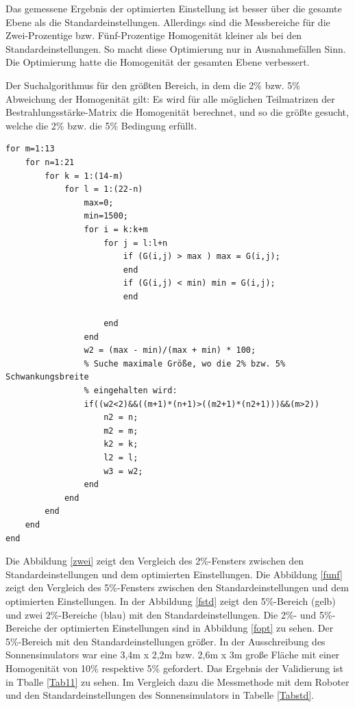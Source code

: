 \documentclass[a4paper,bibtotoc,oneside]{scrbook}
\begin{document}
Das gemessene Ergebnis der optimierten Einstellung ist besser über die gesamte Ebene als die Standardeinstellungen.
Allerdings sind die Messbereiche für die Zwei-Prozentige bzw. Fünf-Prozentige Homogenität kleiner als bei den Standardeinstellungen. So macht diese Optimierung nur in Ausnahmefällen Sinn. Die Optimierung hatte die Homogenität der gesamten Ebene verbessert.

Der Suchalgorithmus für den größten Bereich, in dem die 2\% bzw. 5\% Abweichung der Homogenität gilt: Es wird für alle möglichen Teilmatrizen der Bestrahlungsstärke-Matrix die Homogenität berechnet, und so die größte gesucht, welche die 2\% bzw. die 5\% Bedingung erfüllt.
\begin{verbatim}
for m=1:13
    for n=1:21
        for k = 1:(14-m)
            for l = 1:(22-n)
                max=0;
                min=1500;
                for i = k:k+m
                    for j = l:l+n
                        if (G(i,j) > max ) max = G(i,j);
                        end
                        if (G(i,j) < min) min = G(i,j);
                        end
                        
                    end
                end
                w2 = (max - min)/(max + min) * 100;
                % Suche maximale Größe, wo die 2% bzw. 5% Schwankungsbreite
                % eingehalten wird:
                if((w2<2)&&((m+1)*(n+1)>((m2+1)*(n2+1)))&&(m>2))
                    n2 = n;
                    m2 = m;
                    k2 = k;
                    l2 = l;
                    w3 = w2;
                end
            end
        end
    end
end
\end{verbatim}

Die Abbildung \ref{zwei} zeigt den Vergleich des 2\%-Fensters zwischen den Standardeinstellungen und dem optimierten Einstellungen.
Die Abbildung \ref{funf} zeigt den Vergleich des 5\%-Fensters zwischen den Standardeinstellungen und dem optimierten Einstellungen.
In der Abbildung \ref{fstd} zeigt den 5\%-Bereich (gelb) und zwei 2\%-Bereiche (blau) mit den Standardeinstellungen.
Die 2\%- und 5\%-Bereiche der optimierten Einstellungen sind in Abbildung \ref{fopt} zu sehen. Der 5\%-Bereich mit den Standardeinstellungen größer.
In der Ausschreibung des Sonnensimulators war eine 3,4m x 2,2m bzw. 2,6m x 3m große Fläche mit einer Homogenität von 10\% respektive 5\% gefordert. 
Das Ergebnis der Validierung ist in Tballe \ref{Tab11} zu sehen. Im Vergleich dazu die Messmethode mit dem Roboter und den Standardeinstellungen des Sonnensimulators in Tabelle \ref{Tabstd}.
\end{document}

